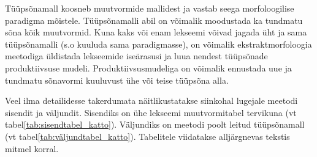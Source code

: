 \documentclass[12pt,a4paper]{article}
\begin{document}
Tüüpsõna\-mall koosneb muutvormide mallidest ja vastab seega morfoloogilise paradigma mõistele. 
Tüüpsõna\-malli abil on võimalik moodustada ka tundmatu sõna kõik muutvormid.
Kuna kaks või enam lekseemi võivad jagada üht ja sama tüüpsõna\-malli (s.o kuuluda sama paradigmasse), on võimalik ekstrakt\-morfoloogia meetodiga üldistada lekseemide iseärasusi ja luua nendest tüüpsõnade produktiivsuse mudeli. Produktiivsus\-mudeliga on võimalik ennustada uue ja tundmatu sõnavormi kuuluvust ühe või teise tüüpsõna alla. 


Veel ilma detailidesse takerdumata näitlikustatakse siinkohal lugejale meetodi sisendit ja väljundit. Sisendiks on ühe lekseemi muutvormitabel tervikuna (vt tabel\nobreakspace \ref{tab:sisendtabel_katto}). Väljundiks on meetodi poolt leitud tüüpsõnamall (vt tabel\nobreakspace \ref{tab:väljundtabel_katto}). Tabelitele viidatakse alljärgnevas tekstis mitmel korral.
\end{document}

